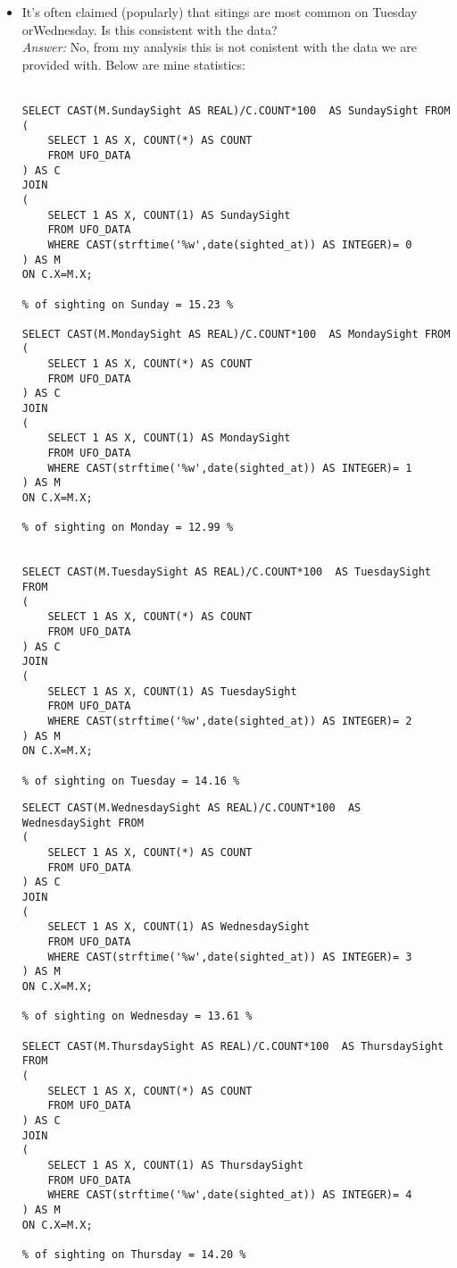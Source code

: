 \documentclass{article}
\begin{document}
\begin{itemize}
\begin{BVerbatim}
\end{BVerbatim}
\item It’s often claimed (popularly) that sitings are most common on Tuesday orWednesday. Is this consistent with the data?\\
\emph{Answer:} No, from my analysis this is not conistent with the data we are provided with. Below are mine statistics: \\ \\
\begin{BVerbatim}
SELECT CAST(M.SundaySight AS REAL)/C.COUNT*100  AS SundaySight FROM 
(
	SELECT 1 AS X, COUNT(*) AS COUNT 
	FROM UFO_DATA
) AS C
JOIN 
(
	SELECT 1 AS X, COUNT(1) AS SundaySight 
	FROM UFO_DATA 
	WHERE CAST(strftime('%
) AS M 
ON C.X=M.X;


SELECT CAST(M.MondaySight AS REAL)/C.COUNT*100  AS MondaySight FROM 
(
	SELECT 1 AS X, COUNT(*) AS COUNT 
	FROM UFO_DATA
) AS C
JOIN 
(
	SELECT 1 AS X, COUNT(1) AS MondaySight 
	FROM UFO_DATA 
	WHERE CAST(strftime('%
) AS M 
ON C.X=M.X;



SELECT CAST(M.TuesdaySight AS REAL)/C.COUNT*100  AS TuesdaySight FROM 
(
	SELECT 1 AS X, COUNT(*) AS COUNT 
	FROM UFO_DATA
) AS C
JOIN 
(
	SELECT 1 AS X, COUNT(1) AS TuesdaySight 
	FROM UFO_DATA 
	WHERE CAST(strftime('%
) AS M 
ON C.X=M.X;

\end{BVerbatim}

\begin{BVerbatim}
SELECT CAST(M.WednesdaySight AS REAL)/C.COUNT*100  AS WednesdaySight FROM 
(
	SELECT 1 AS X, COUNT(*) AS COUNT 
	FROM UFO_DATA
) AS C
JOIN 
(
	SELECT 1 AS X, COUNT(1) AS WednesdaySight 
	FROM UFO_DATA 
	WHERE CAST(strftime('%
) AS M 
ON C.X=M.X;


SELECT CAST(M.ThursdaySight AS REAL)/C.COUNT*100  AS ThursdaySight FROM 
(
	SELECT 1 AS X, COUNT(*) AS COUNT 
	FROM UFO_DATA
) AS C
JOIN 
(
	SELECT 1 AS X, COUNT(1) AS ThursdaySight 
	FROM UFO_DATA 
	WHERE CAST(strftime('%
) AS M 
ON C.X=M.X;



\end{BVerbatim}
\end{itemize}
\end{document}
